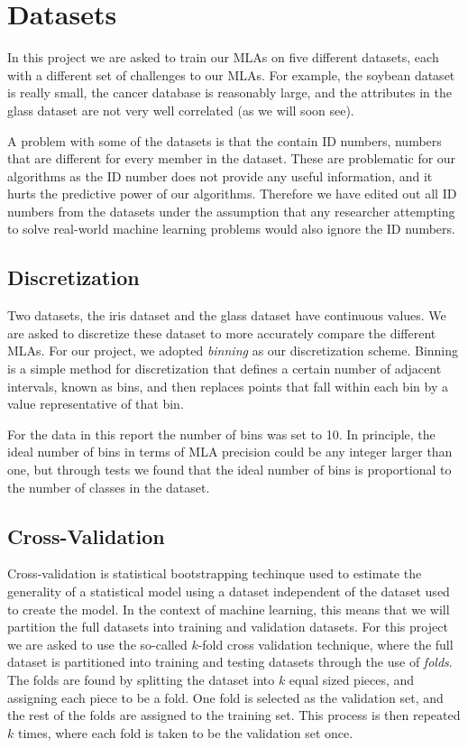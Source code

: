 \documentclass{article}
\begin{document}
\section{Datasets}

	In this project we are asked to train our MLAs on five different datasets, each with a different set of challenges to our MLAs. 
	For example, the soybean dataset is really small, the cancer database is reasonably large, and the attributes in the glass dataset are not very well correlated (as we will soon see).
	
	A problem with some of the datasets is that the contain ID numbers, numbers that are different for every member in the dataset. These are problematic for our algorithms as the ID number does not provide any useful information, and it hurts the predictive power of our algorithms. Therefore we have edited out all ID numbers from the datasets under the assumption that any researcher attempting to solve real-world machine learning problems would also ignore the ID numbers.
	
	\subsection{Discretization}
	
		Two datasets, the iris dataset and the glass dataset have continuous values. 
		We are asked to discretize these dataset to more accurately compare the different MLAs.
		For our project, we adopted \textit{binning} as our discretization scheme.
		Binning is a simple method for discretization that defines a certain number of adjacent intervals, known as bins, and then replaces points that fall within each bin by a value representative of that bin.
		
		For the data in this report the number of bins was set to 10. In principle, the ideal number of bins in terms of MLA precision could be any integer larger than one, but through tests we found that the ideal number of bins is proportional to the number of classes in the dataset.
	
	\subsection{Cross-Validation}
	
		Cross-validation is statistical bootstrapping techinque used to estimate the generality of a statistical model using a dataset independent of the dataset used to create the model. 
		In the context of machine learning, this means that we will partition the full datasets into training and validation datasets. 
		For this project we are asked to use the so-called $k$-fold cross validation technique, where the full dataset is partitioned into training and testing datasets through the use of \textit{folds}. 
		The folds are found by splitting the dataset into $k$ equal sized pieces, and assigning each piece to be a fold. 
		One fold is selected as the validation set, and the rest of the folds are assigned to the training set. 
		This process is then repeated $k$ times, where each fold is taken to be the validation set once.
	
\end{document}
